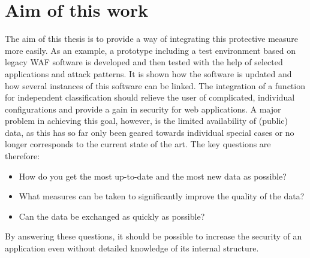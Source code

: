 

\section{Aim of this work}
\label{sec:einleitungziel}

The aim of this thesis is to provide a way of integrating this protective measure more easily. As an example, a prototype including a test environment based on legacy WAF software is developed and then tested with the help of selected applications and attack patterns.  It is shown how the software is updated and how several instances of this software can be linked. The integration of a function for independent classification should relieve the user of complicated, individual configurations and provide a gain in security for web applications. A major problem in achieving this goal, however, is the limited availability of (public) data, as this has so far only been geared towards individual special cases or no longer corresponds to the current state of the art. The key questions are therefore:


\begin{itemize}
\item How do you get the most up-to-date and the most new data as possible?
\item What measures can be taken to significantly improve the quality of the data?
\item Can the data be exchanged as quickly as possible?
\end{itemize}


By answering these questions, it should be possible to increase the security of an application even without detailed knowledge of its internal structure.\\

